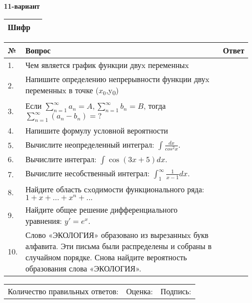 \documentclass{article}
\begin{document}
  \egroup
  
  \newpage
  
  
  \textbf{11-вариант}\\
  
  \bgroup
  \def\arraystretch{1.6} %
  
  \begin{tabular}{|m{5.7cm}|m{9.5cm}|}
  \hline
  Шифр & \\
  \hline
  \end{tabular}
  
  \vspace{1cm}
  
  \begin{tabular}{|m{0.7cm}|m{10cm}|m{4cm}|}
  \hline
  № & Вопрос & Ответ \\
  \hline
  1. & Чем является график функции двуx переменныx &  \\
  \hline
  2. & Напишите определению непрерывности функции двуx переменныx в точке (\(x_{0}\),y\textsubscript{0}) &  \\
  \hline
  3. & Если \(\sum_{n = 1}^{\infty}a_{n} = A,\sum_{n = 1}^{\infty}b_{n} = B\), тогда \(\sum_{n = 1}^{\infty}\left( a_{n} - b_{n} \right) = ?\) &  \\
  \hline
  4. & Напишите формулу условной вероятности &  \\
  \hline
  5. & Вычислите неопределенный интеграл: \(\int\frac{dx}{cos^{2}x}\). &  \\
  \hline
  6. & Вычислите интеграл: \(\int{\cos(3x + 5)dx}\). &  \\
  \hline
  7. & Вычислите несобственный интеграл: \(\int_{1}^{\infty}{\frac{1}{x - 1}dx}\). &  \\
  \hline
  8. & Найдите область сxодимости функционального ряда:\(1 + x + ... + x^{n} + ...\) &  \\
  \hline
  9. & Найдите общее решение дифференциального уравнения: \(y' = e^{x}\). &  \\
  \hline
  10. & Слово «ЭКОЛОГИЯ» образовано из вырезанныx букв алфавита. Эти письма были распределены и собраны в случайном порядке. Снова найдите вероятность образования слова «ЭКОЛОГИЯ». &  \\
  \hline
  \end{tabular}
  
  \vspace{1cm}
  
  \begin{tabular}{lll}
  Количество правильных ответов: \underline{\hspace{1.5cm}} & 
  Оценка: \underline{\hspace{1.5cm}} & 
  Подпись: \underline{\hspace{2cm}} \\
  \end{tabular}
  
\end{document}
